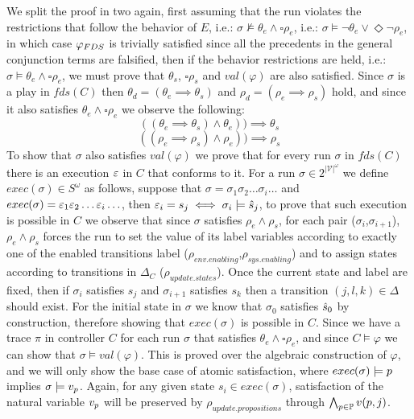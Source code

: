 We split the proof in two again, first assuming that the run violates the restrictions that follow the behavior of $E$, i.e.: $\sigma \not\models \theta_e \wedge \square \rho_e$, i.e.: $\sigma \models \neg\theta_e \vee \Diamond \neg\rho_e$, in which case $\varphi_{FDS}$ is trivially satisfied since all the precedents in the general conjunction terms are falsified, then if the behavior restrictions are held, i.e.: $\sigma \models \theta_e \wedge \square \rho_e$, we must prove that $\theta_s$, $\square\rho_s$ and $val(\varphi)$ are also satisfied. Since $\sigma$ is a play in $fds(C)$ then $\theta_d=(\theta_e \implies \theta_s)$ and $\rho_d=(\rho_e \implies \rho_s)$ hold, and since it also satisfies $\theta_e \wedge \square \rho_e$ we observe the following:
\[((\theta_e \implies \theta_s) \wedge \theta_e))\implies \theta_s\]
\[((\rho_e \implies \rho_s) \wedge \rho_e))\implies \rho_s\]
To show that $\sigma$ also satisfies $val(\varphi)$ we prove that for every run $\sigma$ in $fds(C)$ there is an execution $\varepsilon$ in $C$ that conforms to it.
For a run $\sigma \in 2^{|\mathcal{V}|^{\omega}}$ we define $exec(\sigma) \in S^{\omega}$ as follows, suppose that $\sigma = \sigma_1 \sigma_2 \ldots \sigma_i \ldots$ and
$exec(\sigma)= \varepsilon_1 \varepsilon_2 \ldots \varepsilon_i \ldots$, then $\varepsilon_i = s_j \iff \sigma_i \models \hat{s}_{j}$, to prove that such execution is possible in $C$ we observe that since $\sigma$ satisfies $\rho_e \wedge \rho_s$, for each pair ($\sigma_i$,$\sigma_{i+1}$),  $\rho_e \wedge \rho_s$ forces
the run to set the value of its label variables according to exactly one of the enabled transitions label ($\rho_{env.enabling}$,$\rho_{sys.enabling}$) and to assign states according to transitions in $\Delta_C$ ($\rho_{update.states}$). Once the current state and label are fixed, then if $\sigma_i$ satisfies $s_j$ and $\sigma_{i+1}$ satisfies $s_k$ then a transition $(j, l, k) \in \Delta$ should exist. For the initial state in $\sigma$ we know that $\sigma_0$ satisfies $\hat{s}_{0}$ by construction, therefore showing that $exec(\sigma)$ is possible in $C$.
Since we have a trace $\pi$ in controller $C$ for each run $\sigma$ that satisfies $\theta_e \wedge \square \rho_e$, and since $C \models \varphi$ we can show that $\sigma \models val(\varphi)$. This is proved over the algebraic construction of $\varphi$, and we will only show the base case of atomic satisfaction, where
$exec(\sigma) \models p$ implies $\sigma \models v_{p}$. Again, for any given state $s_i \in exec(\sigma)$, satisfaction of the natural variable $v_{p}$ will be preserved by  $\rho_{update.propositions}$ through $\bigwedge_{p \in \mathbb{P}}v(p,j)$.\\
\\

